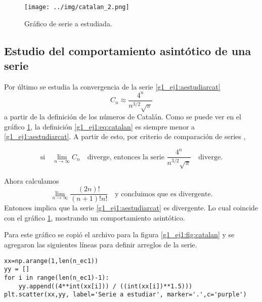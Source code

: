 \documentclass[../portafolio.tex]{subfiles}
\begin{document}
\begin{figure}[ht]
\centering
\texttt{[image: ../img/catalan\_2.png]} 
\caption{Gráfico de serie a estudiada.}
\label{g1_ej1:fig:catalan2}
\end{figure}

\subsection{Estudio del comportamiento asintótico de una serie}
Por último se estudia la convergencia de la serie \eqref{g1_ej1:aestudiarcat}
\begin{equation}\label{g1_ej1:aestudiarcat}
C_n \approx \frac{4^n}{n^{3/2}\sqrt{\pi}}
\end{equation}
a partir de la definición de los números de Catalán. Como se puede ver en el gráfico \ref{g1_ej1:fig:catalan2}, la definición \eqref{g1_ej1:eq:catalan} es siempre menor a \eqref{g1_ej1:aestudiarcat}. A partir de esto, por criterio de comparación de series \citep{Stewart2001},

\begin{equation*}
\text{si} \quad \lim_{n\rightarrow \infty } C_n \quad \text{diverge, entonces la serie } \frac{4^n}{n^{3/2}\sqrt{\pi}}\quad \text{diverge.}
\end{equation*}

Ahora calculamos
\begin{equation*}
\lim_{n\rightarrow \infty } \frac{(2n)!}{(n+1)!n!} \quad \text{y concluimos que es divergente.}
\end{equation*}
Entonces implica que la serie \eqref{g1_ej1:aestudiarcat} es divergente. Lo cual coincide con el gráfico \ref{g1_ej1:fig:catalan2}, mostrando un comportamiento asintótico.

Para este gráfico se copió el archivo para la figura \ref{g1_ej1:fig:catalan} y se agregaron las siguientes líneas para definir arreglos de la serie.

\begin{verbatim}
xx=np.arange(1,len(n_ec1))
yy = [] 
for i in range(len(n_ec1)-1):
    yy.append((4**int(xx[i])) / ((int(xx[i])**1.5)))
plt.scatter(xx,yy, label='Serie a estudiar', marker='.',c='purple')
\end{verbatim}
\end{document}
